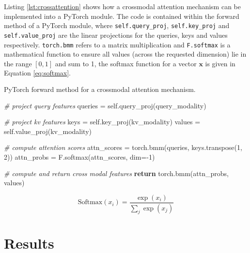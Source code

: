 \documentclass[twocolumn,twoside]{article}
\newenvironment{Shaded}{}{}
\newcommand{\CommentTok}[1]{\textcolor[rgb]{0.38,0.63,0.69}{\textit{#1}}}
\newcommand{\ControlFlowTok}[1]{\textcolor[rgb]{0.00,0.44,0.13}{\textbf{#1}}}
\newcommand{\DecValTok}[1]{\textcolor[rgb]{0.25,0.63,0.44}{#1}}
\newcommand{\NormalTok}[1]{#1}
\newcommand{\OperatorTok}[1]{\textcolor[rgb]{0.40,0.40,0.40}{#1}}
\newcommand{\VariableTok}[1]{\textcolor[rgb]{0.10,0.09,0.49}{#1}}
\begin{document}
Listing \ref{lst:crossattention} shows how a crossmodal attention
mechanism can be implemented into a PyTorch module. The code is
contained within the forward method of a PyTorch module, where
\texttt{self.query\_proj}, \texttt{self.key\_proj} and
\texttt{self.value\_proj} are the linear projections for the queries,
keys and values respectively. \texttt{torch.bmm} refers to a matrix
multiplication and \texttt{F.softmax} is a mathematical function to
ensure all values (across the requested dimension) lie in the range
\([0,1]\) and sum to 1, the softmax function for a vector \(\mathbf{x}\)
is given in Equation \ref{eq:softmax}.

\begin{codelisting}

\caption{PyTorch forward method for a crossmodal attention mechanism.}\label{lst:crossattention}

\begin{Shaded}
\begin{Highlighting}[numbers=left,,]
\CommentTok{\# project query features}
\NormalTok{queries }\OperatorTok{=} \VariableTok{self}\NormalTok{.query\_proj(query\_modality)}

\CommentTok{\# project kv features}
\NormalTok{keys }\OperatorTok{=} \VariableTok{self}\NormalTok{.key\_proj(kv\_modality)}
\NormalTok{values }\OperatorTok{=} \VariableTok{self}\NormalTok{.value\_proj(kv\_modality)}

\CommentTok{\# compute attention scores}
\NormalTok{attn\_scores }\OperatorTok{=}\NormalTok{ torch.bmm(queries, keys.transpose(}\DecValTok{1}\NormalTok{, }\DecValTok{2}\NormalTok{))}
\NormalTok{attn\_probs }\OperatorTok{=}\NormalTok{ F.softmax(attn\_scores, dim}\OperatorTok{={-}}\DecValTok{1}\NormalTok{)}

\CommentTok{\# compute and return cross modal features}
\ControlFlowTok{return}\NormalTok{ torch.bmm(attn\_probs, values)}
\end{Highlighting}
\end{Shaded}

\end{codelisting}

\begin{equation} \text{Softmax}(x_i) = \frac{\exp(x_i)}{\sum_j \exp(x_j)} \label{eq:softmax}\end{equation}

\section{Results}\label{results}
\end{document}
